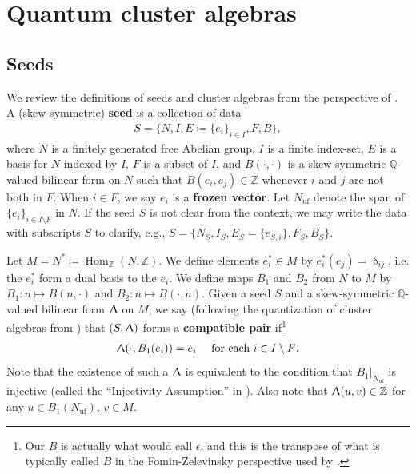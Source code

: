\documentclass{amsart}
\DeclareMathOperator{\Hom}{Hom}
\DeclareMathOperator{\uf}{uf}
\let\bb=\mathbb
\renewcommand{\delta}{\updelta}
\renewcommand{\Lambda}{\Uplambda}
\theoremstyle{plain}%
\theoremstyle{definition}
\theoremstyle{remark}
\begin{document}
\section{Quantum cluster algebras}
\label{QCA_sec}
\subsection{Seeds}\label{DinS}

We review the definitions of seeds and cluster algebras from the perspective of \cite{FG1}.  A (skew-symmetric) \textbf{seed} is a collection of data \begin{align}\label{S}
     S=\{N,I,E\coloneqq \{e_{i}\}_{i\in I},F,B\},
\end{align} where $N$ is a finitely generated free Abelian group, $I$ is a finite index-set, $E$ is a basis for $N$ indexed by $I$, $F$ is a subset of $I$, and $B(\cdot,\cdot)$ is a skew-symmetric $\bb{Q}$-valued bilinear form on $N$ such that $B(e_i,e_j)\in \bb{Z}$ whenever $i$ and $j$ are not both in $F$.   When $i\in F$, we say $e_i$ is a \textbf{frozen vector}.  Let $N_{\uf}$ denote the span of $\{e_i\}_{i\in I\setminus F}$ in $N$.  If the seed $S$ is not clear from the context, we may write the data with subscripts $S$ to clarify, e.g., $S=\{N_S,I_S,E_S=\{e_{S,i}\},F_S,B_S\}$.


Let $M= N^*\coloneqq \Hom_{\mathbb{Z}}(N,\mathbb{Z})$.  We define elements $e^*_i\in M$ by $e^*_i(e_j)=\delta_{ij}$, i.e. the $e^*_i$ form a dual basis to the $e_i$.  We define maps $B_1$ and $B_2$ from $N$ to $M$ by $B_1\colon n\mapsto B(n,\cdot)$ and $B_2\colon n\mapsto B(\cdot,n)$.  Given a seed $S$ and a skew-symmetric $\bb{Q}$-valued bilinear form $\Lambda$ on $M$, we say (following the quantization of cluster algebras from \cite{BZ}) that $(S,\Lambda)$ forms a \textbf{compatible pair} if\footnote{Our $B$ is actually what \cite{FG1} would call $\epsilon$, and this is the transpose of what is typically called $B$ in the Fomin-Zelevinsky \cite{FZ} perspective used by \cite{BZ}.}
\begin{align}\label{Lambda}
\begin{array}{c l}
\Lambda(\cdot,B_1(e_i)) = e_i 
 &\mbox{ for each $i\in I\setminus F$.}
\end{array}
\end{align}
Note that the existence of such a $\Lambda$ is equivalent to the condition that $B_1|_{N_{\uf}}$ is injective (called the ``Injectivity Assumption'' in \cite{GHKK}).  Also note that $\Lambda(u,v)\in \bb{Z}$ for any $u\in B_1(N_{\uf})$, $v\in M$. 
\end{document}
